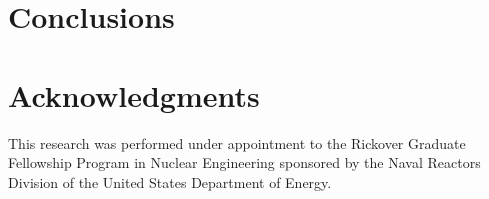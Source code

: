 \documentclass[preprint,10pt]{elsarticle}
\begin{document}
\section{Conclusions} \label{sec::conclusions}


\section*{Acknowledgments} 
This research was performed under appointment to the Rickover Graduate Fellowship Program in Nuclear Engineering sponsored by the Naval Reactors Division of the United States Department of Energy.

\pagebreak





\end{document}

